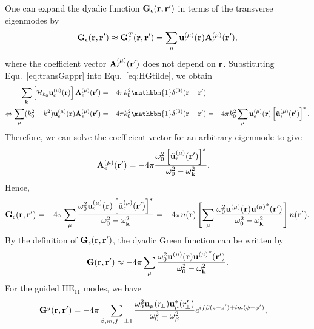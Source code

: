 One can expand the dyadic function $ \mathbf{G}_\epsilon(\mathbf{r},\mathbf{r}') $ in terms of the transverse eigenmodes by
\begin{align}
\mathbf{G}_\epsilon(\br,\br')\approx\mathbf{G}_\epsilon^T(\br,\br')= \sum_{\mu} \mathbf{u}_\epsilon^{(\mu)}(\br) \mathbf{A}_\epsilon^{(\mu)}(\br'), \label{eq:transGappr}
\end{align}
where the coefficient vector $\mathbf{A}_\epsilon^{(\mu)}(\mathbf{r}')  $ does not depend on $ \mathbf{r} $.
Substituting Equ.~\eqref{eq:transGappr} into Equ.~\eqref{eq:HGtilde}, we obtain
\begin{align}
\sum_{\mathbf{k}} \left[ \mathcal{H}_{k_0}  \mathbf{u}_\epsilon^{(\mu)}(\br)\right] \mathbf{A}_\epsilon^{(\mu)}(\br') &= -4\pi k_0^2\mathbbm{1}\delta^{(3)}(\br-\br')\\
\Leftrightarrow \sum_\mu (k_0^2-k^2) \mathbf{u}_\epsilon^{(\mu)}(\br) \mathbf{A}_\epsilon^{(\mu)}(\br') &= -4\pi k_0^2\mathbbm{1}\delta^{(3)}(\br-\br') = -4\pi k_0^2\sum_{\mu} \mathbf{u}_\epsilon^{(\mu)}(\mathbf{r} )\left[\tilde{\mathbf{u}}_\epsilon^{(\mu)}(\mathbf{r}^\prime )\right]^*.
\end{align}
Therefore, we can solve the coefficient vector for an arbitrary eigenmode to give
\begin{align}
\mathbf{A}_\epsilon^{(\mu)}(\mathbf{r}') &= -4\pi\frac{\omega_0^2 \left[ \tilde{\mathbf{u}}_\epsilon^{(\mu)}(\mathbf{r}')\right]^*}{\omega_0^2-\omega_{\mathbf{k}}^2}.
\end{align}
Hence, 
\begin{align}
\mathbf{G}_\epsilon(\mathbf{r},\mathbf{r}')= -4\pi\sum_{\mu} \frac{\omega_0^2\mathbf{u}_\epsilon^{(\mu)}(\mathbf{r})\left[\tilde{\mathbf{u}}_\epsilon^{(\mu)}(\mathbf{r}')\right]^*}{\omega_0^2-\omega_{\mathbf{k}}^2} = -4\pi n(\mathbf{r}) \left[\sum_{\mu} \frac{\omega_0^2 {\mathbf{u}}^{(\mu)}(\mathbf{r}) {\mathbf{u}^{(\mu)}}^*(\mathbf{r}')}{\omega_0^2-\omega_{\mathbf{k}}^2} \right]n(\mathbf{r}').
\end{align}
By the definition of $\mathbf{G}_\epsilon(\mathbf{r},\mathbf{r}')  $, the dyadic Green function can be written by 
\begin{align}
\mathbf{G}(\mathbf{r},\mathbf{r}')\approx -4\pi\sum_{\mu} \frac{\omega_0^2\mathbf{u}^{(\mu)}(\mathbf{r}) {\mathbf{u}^{(\mu)}}^*(\mathbf{r}')}{\omega_0^2-\omega_{\mathbf{k}}^2}.
\end{align}
For the guided $\mathrm{HE}_{11}$ modes, we have 
\begin{align}
\mathbf{G}^g(\br,\br') &= -4\pi\sum_{\beta,m,f=\pm 1} \frac{\omega_0^2\mathbf{u}_{\mu}(r\!_\perp)\mathbf{u}^*_{\mu}(r_{\!\perp}^\prime)}{\omega_0^2-\omega_\beta^2}e^{if\beta(z-z')+im(\phi-\phi')},\label{eq:Gganaly}
\end{align}
